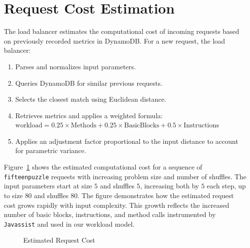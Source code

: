 \documentclass[conference]{IEEEtran}
\begin{document}
\section{Request Cost Estimation}

The load balancer estimates the computational cost of incoming requests based on
previously recorded metrics in DynamoDB. For a new request, the load balancer:

\begin{enumerate}
    \item Parses and normalizes input parameters.
    \item Queries DynamoDB for similar previous requests.
    \item Selects the closest match using Euclidean distance.
    \item Retrieves metrics and applies a weighted formula:
    $\text{workload} = 0.25 \times \text{Methods} + 0.25 \times \text{BasicBlocks} + 0.5 \times \text{Instructions}$
    \item Applies an adjustment factor proportional to the input distance to
    account for parametric variance.
\end{enumerate}

Figure~\ref{fig:workload-cost} shows the estimated computational cost for a sequence of \texttt{fifteenpuzzle} requests with increasing problem size and number of shuffles. The input parameters start at size $5$ and shuffles $5$, increasing both by $5$ each step, up to size $80$ and shuffles $80$. The figure demonstrates how the estimated request cost grows rapidly with input complexity. This growth reflects the increased number of basic blocks, instructions, and method calls instrumented by \texttt{Javassist} and used in our workload model.

\begin{figure}
\caption{Estimated Request Cost}
\label{fig:workload-cost}
\end{figure}
\end{document}
